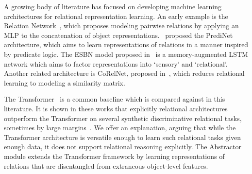 
% 

A growing body of literature has focused on developing machine learning architectures for relational representation learning. An early example is the Relation Network~\citep{santoro1}, which proposes modeling pairwise relations by applying an MLP to the concatenation of object representations.~\citet{shanahanExplicitlyRelationalNeural} proposed the PrediNet architecture, which aims to learn representations of relations in a manner inspired by predicate logic. The ESBN model proposed in~\citep{esbn} is a memory-augmented LSTM network which aims to factor representations into `sensory' and `relational'.
Another related architecture is CoRelNet, proposed in~\citep{kerg2022neural}, which reduces relational learning to modeling a similarity matrix.

The Transformer~\citep{vaswani2017attention} is a common baseline which is compared against in this literature. It is shown in these works that explicitly relational architectures outperform the Transformer on several synthetic discriminative relational tasks, sometimes by large margins~\citep{shanahanExplicitlyRelationalNeural,esbn,kerg2022neural}. We offer an explanation, arguing that while the Transformer architecture is versatile enough to learn such relational tasks given enough data, it does not support relational reasoning explicitly. The Abstractor module extends the Transformer framework by learning representations of relations that are disentangled from extraneous object-level features.

